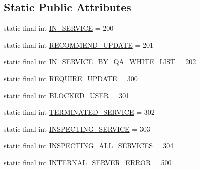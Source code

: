 \subsection*{Static Public Attributes}
\begin{DoxyCompactItemize}
\item 
static final int \hyperlink{classcom_1_1toast_1_1android_1_1gamebase_1_1launching_1_1data_1_1_launching_status_aae596a26b493875f4001dfac6d6b572e}{I\+N\+\_\+\+S\+E\+R\+V\+I\+CE} = 200
\item 
static final int \hyperlink{classcom_1_1toast_1_1android_1_1gamebase_1_1launching_1_1data_1_1_launching_status_a11dabce516910dc589608baee050d7a4}{R\+E\+C\+O\+M\+M\+E\+N\+D\+\_\+\+U\+P\+D\+A\+TE} = 201
\item 
static final int \hyperlink{classcom_1_1toast_1_1android_1_1gamebase_1_1launching_1_1data_1_1_launching_status_ac47752f185e8ef29fd624cff4ac85c9b}{I\+N\+\_\+\+S\+E\+R\+V\+I\+C\+E\+\_\+\+B\+Y\+\_\+\+Q\+A\+\_\+\+W\+H\+I\+T\+E\+\_\+\+L\+I\+ST} = 202
\item 
static final int \hyperlink{classcom_1_1toast_1_1android_1_1gamebase_1_1launching_1_1data_1_1_launching_status_a8e7d5c64b43393328ec39590715a2282}{R\+E\+Q\+U\+I\+R\+E\+\_\+\+U\+P\+D\+A\+TE} = 300
\item 
static final int \hyperlink{classcom_1_1toast_1_1android_1_1gamebase_1_1launching_1_1data_1_1_launching_status_a0fe4925ebb0a22038ef69af7d05f8b17}{B\+L\+O\+C\+K\+E\+D\+\_\+\+U\+S\+ER} = 301
\item 
static final int \hyperlink{classcom_1_1toast_1_1android_1_1gamebase_1_1launching_1_1data_1_1_launching_status_abec9670d386b7f1b2d009df4ed2d9766}{T\+E\+R\+M\+I\+N\+A\+T\+E\+D\+\_\+\+S\+E\+R\+V\+I\+CE} = 302
\item 
static final int \hyperlink{classcom_1_1toast_1_1android_1_1gamebase_1_1launching_1_1data_1_1_launching_status_af35b82d2dd87ed6ce663218b8f0bbfc9}{I\+N\+S\+P\+E\+C\+T\+I\+N\+G\+\_\+\+S\+E\+R\+V\+I\+CE} = 303
\item 
static final int \hyperlink{classcom_1_1toast_1_1android_1_1gamebase_1_1launching_1_1data_1_1_launching_status_a8c0ef43ca7dd8c8af52fa005c78f1059}{I\+N\+S\+P\+E\+C\+T\+I\+N\+G\+\_\+\+A\+L\+L\+\_\+\+S\+E\+R\+V\+I\+C\+ES} = 304
\item 
static final int \hyperlink{classcom_1_1toast_1_1android_1_1gamebase_1_1launching_1_1data_1_1_launching_status_a474f220979d03fbafc9aa9eb51126f2c}{I\+N\+T\+E\+R\+N\+A\+L\+\_\+\+S\+E\+R\+V\+E\+R\+\_\+\+E\+R\+R\+OR} = 500
\end{DoxyCompactItemize}



